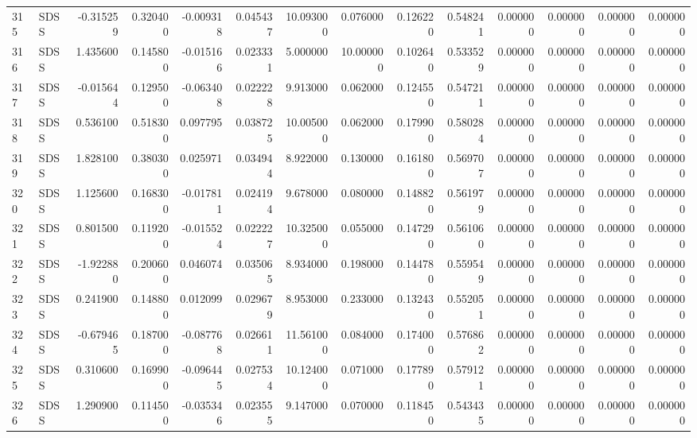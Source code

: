 \begin{tabular}{llrrrrrrrrrrrr}
315 &   SDSS & -0.315259 &      0.320400 & -0.009318 &    0.045437 &  10.093000 &      0.076000 &   0.126220 &  0.548241 &  0.000000 &   0.000000 &     0.000000 &     0.000000 \\
316 &   SDSS &  1.435600 &      0.145800 & -0.015166 &    0.023331 &   5.000000 &     10.000000 &   0.102640 &  0.533529 &  0.000000 &   0.000000 &     0.000000 &     0.000000 \\
317 &   SDSS & -0.015644 &      0.129500 & -0.063408 &    0.022228 &   9.913000 &      0.062000 &   0.124550 &  0.547211 &  0.000000 &   0.000000 &     0.000000 &     0.000000 \\
318 &   SDSS &  0.536100 &      0.518300 &  0.097795 &    0.038725 &  10.005000 &      0.062000 &   0.179900 &  0.580284 &  0.000000 &   0.000000 &     0.000000 &     0.000000 \\
319 &   SDSS &  1.828100 &      0.380300 &  0.025971 &    0.034944 &   8.922000 &      0.130000 &   0.161800 &  0.569707 &  0.000000 &   0.000000 &     0.000000 &     0.000000 \\
320 &   SDSS &  1.125600 &      0.168300 & -0.017811 &    0.024194 &   9.678000 &      0.080000 &   0.148820 &  0.561979 &  0.000000 &   0.000000 &     0.000000 &     0.000000 \\
321 &   SDSS &  0.801500 &      0.119200 & -0.015524 &    0.022227 &  10.325000 &      0.055000 &   0.147290 &  0.561060 &  0.000000 &   0.000000 &     0.000000 &     0.000000 \\
322 &   SDSS & -1.922880 &      0.200600 &  0.046074 &    0.035065 &   8.934000 &      0.198000 &   0.144780 &  0.559549 &  0.000000 &   0.000000 &     0.000000 &     0.000000 \\
323 &   SDSS &  0.241900 &      0.148800 &  0.012099 &    0.029679 &   8.953000 &      0.233000 &   0.132430 &  0.552051 &  0.000000 &   0.000000 &     0.000000 &     0.000000 \\
324 &   SDSS & -0.679465 &      0.187000 & -0.087768 &    0.026611 &  11.561000 &      0.084000 &   0.174000 &  0.576862 &  0.000000 &   0.000000 &     0.000000 &     0.000000 \\
325 &   SDSS &  0.310600 &      0.169900 & -0.096445 &    0.027534 &  10.124000 &      0.071000 &   0.177890 &  0.579121 &  0.000000 &   0.000000 &     0.000000 &     0.000000 \\
326 &   SDSS &  1.290900 &      0.114500 & -0.035346 &    0.023555 &   9.147000 &      0.070000 &   0.118450 &  0.543435 &  0.000000 &   0.000000 &     0.000000 &     0.000000 \\

\end{tabular}
